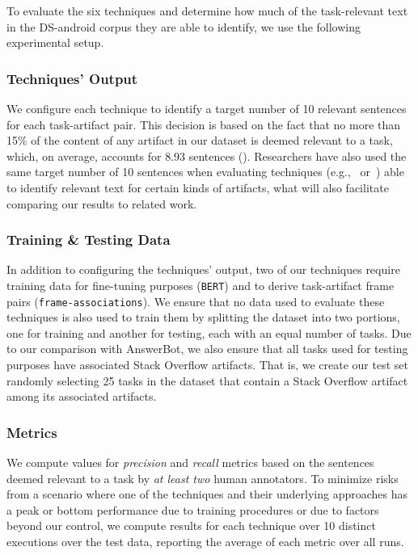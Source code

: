 To evaluate the six techniques and determine how much of the task-relevant text in the \acs{DS-android} corpus they are able to identify, we use the following experimental setup.

\subsubsection{Techniques' Output}


We configure each technique to identify a target number of 10 relevant sentences for each task-artifact pair.
This decision is based on the fact that no more than 15\% of the content of any artifact in our dataset is deemed relevant to a task, which, on average, accounts for 8.93 sentences ().
Researchers have also used the same target number of 10 sentences when evaluating techniques  (e.g.,~\cite{Xu2017} or~\cite{Lotufo2012}) able to identify relevant text for certain kinds of artifacts, what will also facilitate comparing our results to related work.


\subsubsection{Training \& Testing Data}


In addition to configuring the techniques' output, two of our techniques require training data for fine-tuning purposes (\texttt{BERT}) and to derive task-artifact frame pairs (\texttt{frame-associations}).
We ensure that no data used to evaluate these techniques is also used to train them by 
splitting the dataset into two portions, one for training and another for testing, each with an equal number of tasks.
Due to our comparison with AnswerBot, we also ensure that all tasks used for testing purposes have associated Stack Overflow artifacts.
That is, we create our test set randomly selecting 25 tasks in the dataset that contain a 
Stack Overflow artifact among its associated artifacts.




\subsubsection{Metrics}



We compute values for \textit{precision} and \textit{recall} metrics based on the sentences 
deemed relevant to a task by \textit{at least two} human annotators.
To minimize risks from a scenario where one of the techniques and their underlying approaches has a peak or
bottom performance due to training procedures or due to factors beyond our control, 
we compute results for each technique over 10 distinct executions over the test data, 
reporting the average of each metric over all runs.



